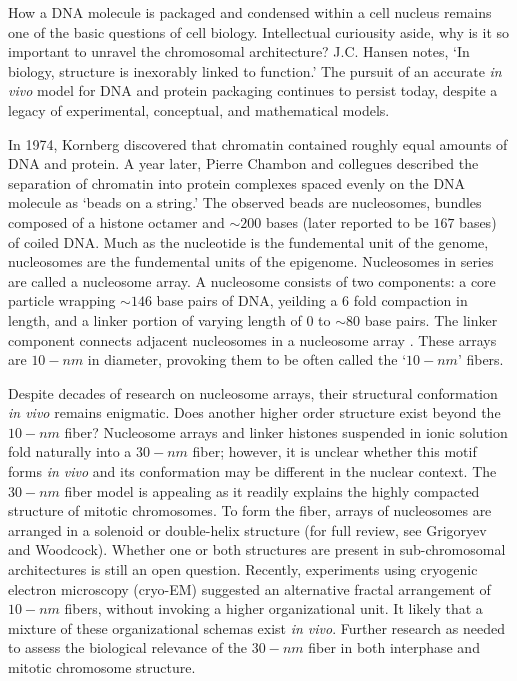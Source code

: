 \documentclass[phd,tocprelim]{cornell}
\begin{document}
How a DNA molecule is packaged and condensed within a cell nucleus remains
one of the basic questions of cell biology.  Intellectual curiousity aside,
why is it so important to unravel the chromosomal architecture?  J.C. Hansen
notes, `In biology, structure is inexorably linked to function.'\cite{hansen2012}
The pursuit of an accurate \textit{in vivo} model for DNA and protein packaging
continues to persist today, despite a legacy of experimental, conceptual, and
mathematical models.

In 1974, Kornberg discovered that chromatin contained roughly equal amounts of
DNA and protein\cite{kornberg1974}.  A year later, Pierre Chambon and collegues
described the separation of chromatin into protein complexes spaced evenly on the DNA
molecule as `beads on a string.'\cite{oudet1975}  The observed beads are nucleosomes,
bundles composed of a histone octamer and $\sim200$ bases (later reported to be
$167$ bases\cite{robinson2006}) of coiled DNA\@.
Much as the nucleotide is the fundemental unit of the genome, nucleosomes are
the fundemental units of the epigenome.  Nucleosomes in series are called a
nucleosome array.  A nucleosome consists of two components: a core particle
wrapping $\sim146$ base pairs of DNA, yeilding a 6 fold compaction in length,
and a linker portion of varying length of $0$ to $\sim80$ base pairs.  The
linker component connects adjacent nucleosomes in a nucleosome array\cite{wu2007}%
\cite{hansen2012}.  These arrays are $10-nm$ in diameter, provoking them to be
often called the `$10-nm$' fibers.

Despite decades of research on nucleosome arrays, their structural conformation
\textit{in vivo} remains enigmatic.   Does another higher order structure exist
beyond the $10-nm$ fiber?  Nucleosome arrays and linker histones suspended in ionic
solution fold naturally into a $30-nm$ fiber\cite{tremethick2007}; however, it
is unclear whether this motif forms \textit{in vivo} and its conformation may
be different in the nuclear context\cite{bian2012}.  The $30-nm$ fiber model
is appealing as it readily explains the highly compacted structure of mitotic
chromosomes.  To form the fiber, arrays of nucleosomes are arranged in a
solenoid or double-helix structure (for full review, see Grigoryev and
Woodcock\cite{grigoryev2012}).  Whether one or both structures are present in
sub-chromosomal architectures is still an open question\cite{song2014}.  Recently,
experiments using cryogenic electron microscopy (cryo-EM) suggested an
alternative fractal arrangement of $10-nm$ fibers, without invoking a higher
organizational unit\cite{nishino2012}\cite{hansen2012}.  It likely that a
mixture of these organizational schemas exist \textit{in vivo}.  Further
research as needed to assess the biological relevance of the $30-nm$ fiber in
both interphase and mitotic chromosome structure.
\end{document}
